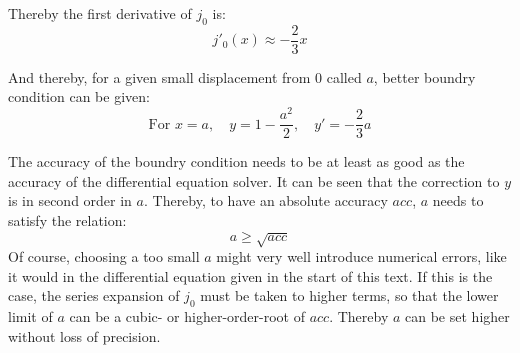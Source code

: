 \documentclass[twocolumn]{article}
\begin{document}
Thereby the first derivative of $j_0$ is:
\begin{equation}
j'_0(x) \approx -\frac{2}{3}x
\end{equation}

And thereby, for a given small displacement from 0 called $a$, better boundry condition can be given:
\begin{equation}
\textrm{For } x = a, \quad y = 1 - \frac{a^2}{2},\quad y'= -\frac{2}{3}a
\end{equation}

The accuracy of the boundry condition needs to be at least as good as the accuracy of the differential equation solver. It can be seen that the correction to $y$ is in second order in $a$. Thereby, to have an absolute accuracy $acc$, $a$ needs to satisfy the relation:
\begin{equation}
a \geq \sqrt{acc}
\end{equation}
Of course, choosing a too small $a$ might very well introduce numerical errors, like it would in the differential equation given in the start of this text. If this is the case, the series expansion of $j_0$ must be taken to higher terms, so that the lower limit of $a$ can be a cubic- or higher-order-root of $acc$. Thereby $a$ can be set higher without loss of precision.

{}

\end{document}
